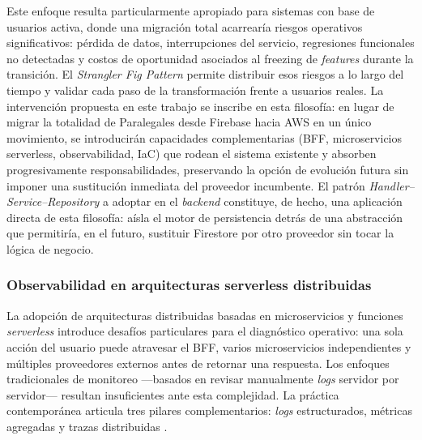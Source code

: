 Este enfoque resulta particularmente apropiado para sistemas con base de usuarios activa, donde una migración total acarrearía riesgos operativos significativos: pérdida de datos, interrupciones del servicio, regresiones funcionales no detectadas y costos de oportunidad asociados al freezing de \textit{features} durante la transición. El \textit{Strangler Fig Pattern} permite distribuir esos riesgos a lo largo del tiempo y validar cada paso de la transformación frente a usuarios reales. La intervención propuesta en este trabajo se inscribe en esta filosofía: en lugar de migrar la totalidad de Paralegales desde Firebase hacia AWS en un único movimiento, se introducirán capacidades complementarias (BFF, microservicios serverless, observabilidad, IaC) que rodean el sistema existente y absorben progresivamente responsabilidades, preservando la opción de evolución futura sin imponer una sustitución inmediata del proveedor incumbente. El patrón \textit{Handler--Service--Repository} a adoptar en el \textit{backend} constituye, de hecho, una aplicación directa de esta filosofía: aísla el motor de persistencia detrás de una abstracción que permitiría, en el futuro, sustituir Firestore por otro proveedor sin tocar la lógica de negocio.

\subsubsection{Observabilidad en arquitecturas serverless distribuidas}

La adopción de arquitecturas distribuidas basadas en microservicios y funciones \textit{serverless} introduce desafíos particulares para el diagnóstico operativo: una sola acción del usuario puede atravesar el BFF, varios microservicios independientes y múltiples proveedores externos antes de retornar una respuesta. Los enfoques tradicionales de monitoreo —basados en revisar manualmente \textit{logs} servidor por servidor— resultan insuficientes ante esta complejidad. La práctica contemporánea articula tres pilares complementarios: \textit{logs} estructurados, métricas agregadas y trazas distribuidas \cite{Sridharan2018}.

